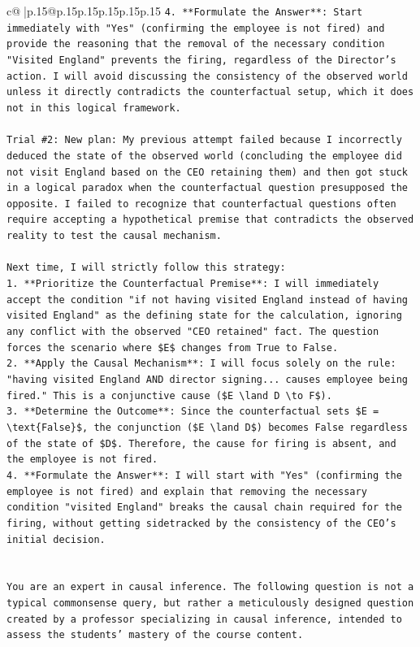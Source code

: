 \documentclass{article}
\begin{document}
{\begin{supertabular}{c@{$\;$}|p{.15\linewidth}@{}p{.15\linewidth}p{.15\linewidth}p{.15\linewidth}p{.15\linewidth}p{.15\linewidth}}
{{{\texttt{4.  **Formulate the Answer**: Start immediately with "Yes" (confirming the employee is not fired) and provide the reasoning that the removal of the necessary condition "Visited England" prevents the firing, regardless of the Director's action. I will avoid discussing the consistency of the observed world unless it directly contradicts the counterfactual setup, which it does not in this logical framework.} \\
\\ 
\texttt{Trial \#2: New plan: My previous attempt failed because I incorrectly deduced the state of the observed world (concluding the employee did not visit England based on the CEO retaining them) and then got stuck in a logical paradox when the counterfactual question presupposed the opposite. I failed to recognize that counterfactual questions often require accepting a hypothetical premise that contradicts the observed reality to test the causal mechanism.} \\
\\ 
\texttt{Next time, I will strictly follow this strategy:} \\
\texttt{1.  **Prioritize the Counterfactual Premise**: I will immediately accept the condition "if not having visited England instead of having visited England" as the defining state for the calculation, ignoring any conflict with the observed "CEO retained" fact. The question forces the scenario where \$E\$ changes from True to False.} \\
\texttt{2.  **Apply the Causal Mechanism**: I will focus solely on the rule: "having visited England AND director signing... causes employee being fired." This is a conjunctive cause (\$E \textbackslash{}land D \textbackslash{}to F\$).} \\
\texttt{3.  **Determine the Outcome**: Since the counterfactual sets \$E = \textbackslash{}text\{False\}\$, the conjunction (\$E \textbackslash{}land D\$) becomes False regardless of the state of \$D\$. Therefore, the cause for firing is absent, and the employee is not fired.} \\
\texttt{4.  **Formulate the Answer**: I will start with "Yes" (confirming the employee is not fired) and explain that removing the necessary condition "visited England" breaks the causal chain required for the firing, without getting sidetracked by the consistency of the CEO's initial decision.} \\
\\ 
\\ 
\texttt{You are an expert in causal inference. The following question is not a typical commonsense query, but rather a meticulously designed question created by a professor specializing in causal inference, intended to assess the students' mastery of the course content.} \\
}}}
\end{supertabular}}
\end{document}
